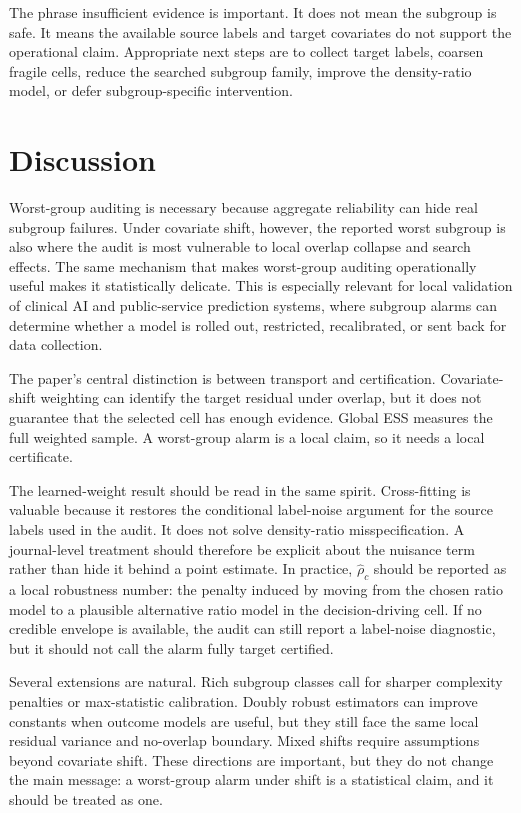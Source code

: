The phrase insufficient evidence is important. It does not mean the subgroup is safe. It means the available source labels and target covariates do not support the operational claim. Appropriate next steps are to collect target labels, coarsen fragile cells, reduce the searched subgroup family, improve the density-ratio model, or defer subgroup-specific intervention.

\section{Discussion}\label{sec:discussion}

Worst-group auditing is necessary because aggregate reliability can hide real subgroup failures. Under covariate shift, however, the reported worst subgroup is also where the audit is most vulnerable to local overlap collapse and search effects. The same mechanism that makes worst-group auditing operationally useful makes it statistically delicate. This is especially relevant for local validation of clinical AI and public-service prediction systems, where subgroup alarms can determine whether a model is rolled out, restricted, recalibrated, or sent back for data collection.

The paper's central distinction is between transport and certification. Covariate-shift weighting can identify the target residual under overlap, but it does not guarantee that the selected cell has enough evidence. Global ESS measures the full weighted sample. A worst-group alarm is a local claim, so it needs a local certificate.

The learned-weight result should be read in the same spirit. Cross-fitting is valuable because it restores the conditional label-noise argument for the source labels used in the audit. It does not solve density-ratio misspecification. A journal-level treatment should therefore be explicit about the nuisance term rather than hide it behind a point estimate. In practice, \(\widehat\rho_c\) should be reported as a local robustness number: the penalty induced by moving from the chosen ratio model to a plausible alternative ratio model in the decision-driving cell. If no credible envelope is available, the audit can still report a label-noise diagnostic, but it should not call the alarm fully target certified.

Several extensions are natural. Rich subgroup classes call for sharper complexity penalties or max-statistic calibration. Doubly robust estimators can improve constants when outcome models are useful, but they still face the same local residual variance and no-overlap boundary. Mixed shifts require assumptions beyond covariate shift. These directions are important, but they do not change the main message: a worst-group alarm under shift is a statistical claim, and it should be treated as one.
